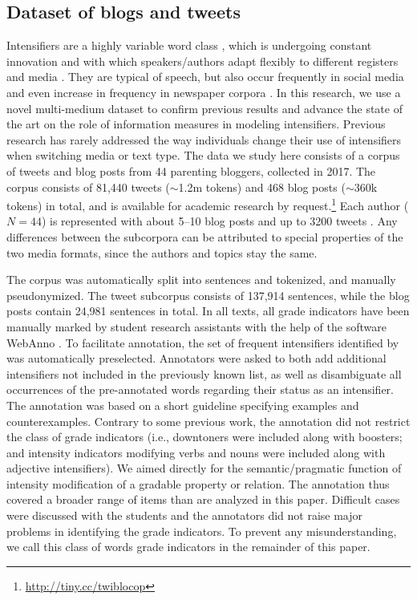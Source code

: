 \documentclass[output=paper,colorlinks,citecolor=brown]{langscibook}
\begin{document}
\subsection{Dataset of blogs and tweets}\label{sec:corpus}
Intensifiers are a highly variable word class \citep{tagliamonte_so_2008,stratton_adjective_2020}, which is undergoing constant innovation and with which speakers/authors adapt flexibly to different registers and media \citep{schefflerEtal2022register}. They are typical of speech, but also occur frequently in social media and even increase in frequency in newspaper corpora \citep{schmidt2022}. In this research, we use a novel multi-medium dataset to confirm previous results and advance the state of the art on the role of information measures in modeling intensifiers. Previous research has rarely addressed the way individuals change their use of intensifiers when switching media or text type. The data we study here consists of a corpus of tweets and blog posts from  44 parenting bloggers, collected in 2017. The corpus consists of 81,440 tweets ($\sim$1.2m tokens) and 468 blog posts ($\sim$360k tokens) in total, and is available for academic research by request.\footnote{\url{http://tiny.cc/twiblocop}} Each author ($N=44$) is represented with about 5--10 blog posts and up to 3200 tweets \citep[for more details, see][]{schefflerEtal2023corpus}. Any differences between the subcorpora can be attributed to special properties of the two media formats, since the authors and topics stay the same. 

The corpus was automatically split into sentences and tokenized, and manually pseudonymized. 
The tweet subcorpus consists of 137,914 sentences, while the blog posts contain 24,981 sentences in total.
In all texts, all grade indicators have been manually marked by student research assistants with the help of the software WebAnno \citep{webanno}. To facilitate annotation, the set of frequent intensifiers identified by \citet{scherihou2022} was automatically preselected. Annotators were asked to both add additional intensifiers not included in the previously known list, as well as disambiguate all occurrences of the pre-annotated words regarding their status as an intensifier. The annotation was  based on a short guideline specifying examples and counterexamples. Contrary to some previous work, the annotation did not restrict the class of grade indicators (i.e., downtoners were included along with boosters; and intensity indicators modifying verbs and nouns were included along with adjective intensifiers). We aimed directly for the semantic/pragmatic function of intensity modification of a gradable property or relation. The annotation thus covered a broader range of items than are analyzed in this paper. Difficult cases were discussed with the students and the annotators did not raise major problems in identifying the grade indicators. To prevent any misunderstanding, we call this class of words  grade indicators in the remainder of this paper.
\end{document}
